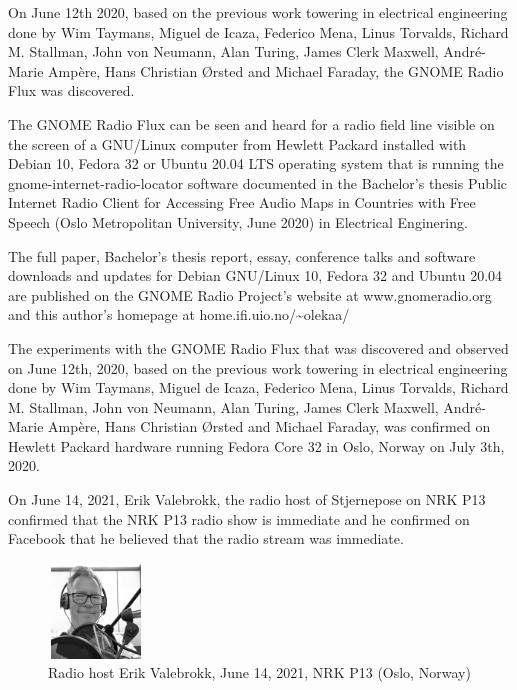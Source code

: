 \documentclass[a4paper]{article}
\begin{document}
On June 12th 2020, based on the previous work towering in 
electrical engineering done by Wim Taymans, Miguel de Icaza, Federico Mena, Linus 
Torvalds, Richard M. Stallman, John von Neumann, Alan Turing, James Clerk 
Maxwell, Andr\'e-Marie Amp\`ere, Hans Christian \O{}rsted and Michael Faraday, the 
GNOME Radio Flux was discovered.

The GNOME Radio Flux can be seen and heard for a radio field line visible on the 
screen of a GNU/Linux computer from Hewlett Packard installed with Debian 10, Fedora 32 or 
Ubuntu 20.04 LTS operating system that is running the 
gnome-internet-radio-locator software documented in the Bachelor's thesis 
Public Internet Radio Client for Accessing Free Audio Maps in Countries 
with Free Speech (Oslo Metropolitan University, June 2020) in Electrical Enginering.

The full paper, Bachelor's thesis report, essay, conference talks and software downloads and updates for Debian GNU/Linux 10, Fedora 32 and Ubuntu 20.04 are published on the GNOME Radio Project's website at www.gnomeradio.org and this author's homepage at home.ifi.uio.no/\textasciitilde{}olekaa/

The experiments with the GNOME Radio Flux that was discovered and
observed on June 12th, 2020, based on the previous work towering in
electrical engineering done by Wim Taymans, Miguel de Icaza, Federico
Mena, Linus Torvalds, Richard M. Stallman, John von Neumann, Alan
Turing, James Clerk Maxwell, Andr\'e-Marie Amp\`ere, Hans Christian
\O{}rsted and Michael Faraday, was confirmed on Hewlett Packard
hardware running Fedora Core 32 in Oslo, Norway on July 3th, 2020.

On June 14, 2021, Erik Valebrokk, the radio host of Stjernepose on NRK P13 confirmed that the
NRK P13 radio show is immediate and he confirmed on Facebook that he believed that the radio stream was immediate.
\begin{figure}[htb]
\begin{center}
\includegraphics[height=1in,width=1in,angle=0]{200011417_10157659305531256_8164538629013258551_n}
\caption{Radio host Erik Valebrokk, June 14, 2021, NRK P13 (Oslo, Norway)}
\end{center}
\end{figure}
\end{document}
